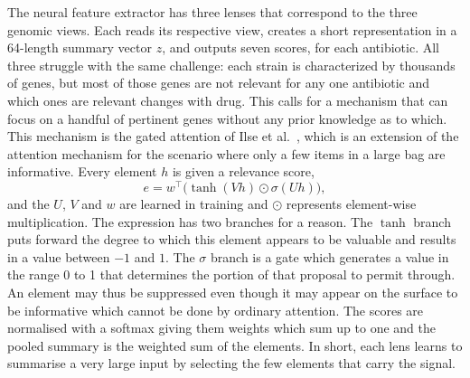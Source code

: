 \documentclass[journal]{IEEEtran}
\begin{document}
The neural feature extractor has three lenses that correspond to the three genomic
views. Each reads its respective view, creates a short representation in a 64-length
summary vector $z$, and outputs seven scores, for each antibiotic. All three
struggle with the same challenge: each strain is characterized by thousands of
genes, but most of those genes are not relevant for any one antibiotic and which ones
are relevant changes with drug. This calls for a mechanism that can focus on a
handful of pertinent genes without any prior knowledge as to which. This mechanism
is the gated attention of Ilse et al.\ \cite{ilse2018attention}, which is an
extension of the attention mechanism \cite{vaswani2017attention} for the scenario
where only a few items in a large bag are informative. Every element $h$ is given a
relevance score,
\begin{equation}
e = w^\top \big(\tanh(V h) \odot \sigma(U h)\big),
\label{eq:gated_attn}
\end{equation}
and the $U$, $V$ and $w$ are learned in training and $\odot$ represents element-wise
multiplication. The expression has two branches for a reason. The $\tanh$ branch
puts forward the degree to which this element appears to be valuable and results in
a value between $-1$ and $1$. The $\sigma$ branch is a gate which generates a value
in the range 0 to 1 that determines the portion of that proposal to permit through.
An element may thus be suppressed even though it may appear on the surface to be
informative which cannot be done by ordinary attention. The scores are normalised
with a softmax giving them weights which sum up to one and the pooled summary is the
weighted sum of the elements. In short, each lens learns to summarise a very large
input by selecting the few elements that carry the signal.
\end{document}
